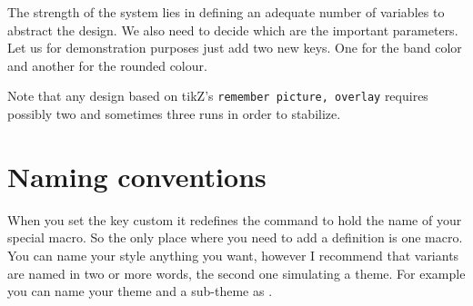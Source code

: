 
The strength of the system lies in defining an adequate number of variables to abstract the design. We also need to decide which are the important parameters. Let us for demonstration purposes just add two new keys.
One for the band color and another for the rounded colour.

\begin{tcblisting}{}
\end{tcblisting}

Note that any design based on tikZ's  \texttt{remember picture, overlay} requires possibly two and sometimes three runs in order to stabilize.


\newcommand{\tikzspecials}[2][]{%
\begin{tikzpicture}[remember picture,overlay]
    \node[yshift=\yshift@cx] at (current page.north west)
      {\begin{tikzpicture}[remember picture, overlay]
        \draw[fill=\fill@cx, draw=none] (0,0) rectangle (\paperwidth,3cm);
        \node[anchor=east,xshift=.9\paperwidth,rectangle,
              rounded corners=10pt,inner sep=11pt,
              fill=\fill@cx]{%
        \titlefontcolor@cx
        \titlefontsize@cx\bfseries
        \titlefontfamily@cx
        \thechapter\
        \textsc{#2}};
      \draw [fill=red] (0,10cm) -- (5cm,10cm);
       \end{tikzpicture}
      };
\end{tikzpicture}
\mbox{}
\vspace*{60pt}\par
}

\section{Naming conventions}

When you set the key custom it redefines the command  to hold the name of your special macro.  So the only place where you need to add a definition is one macro. You can name your style anything you want, however I recommend that variants are named in two or more words, the second one simulating a theme. For example you can name your theme  and a sub-theme as  .



